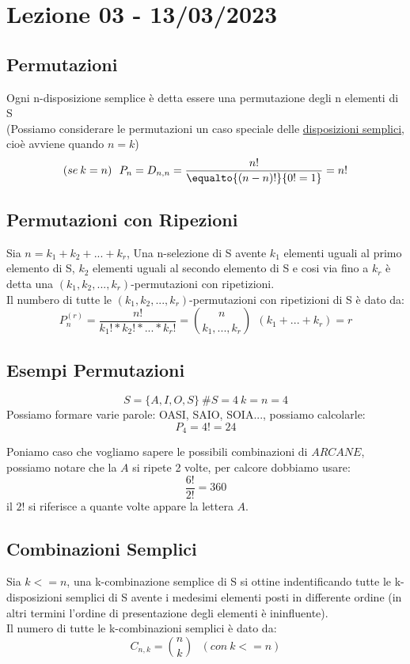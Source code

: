 \section{Lezione 03 - 13/03/2023}

\subsection{Permutazioni}
Ogni n-disposizione semplice è detta essere una permutazione degli n elementi di S\\
(Possiamo considerare le permutazioni un caso speciale delle 
\hyperref[sec:disposizioni]{disposizioni semplici}, cioè avviene quando $n=k$)
$$ (se \: k=n) \: \: \: P_n = D_{n,n} = \frac{n!}{\equalto{(n-n)!}{0!=1}} = n!  $$

\subsection{Permutazioni con Ripezioni}
Sia $n=k_1+k_2+...+k_r$, Una n-selezione di S avente $k_1$ elementi uguali al primo elemento di S, $k_2$ elementi uguali al secondo elemento di S e cosi via fino a $k_r$ è detta una $(k_1,k_2,...,k_r)$-permutazioni con ripetizioni.\\
Il numbero di tutte le $(k_1,k_2,...,k_r)$-permutazioni con ripetizioni di S è dato da:
$$ P^{(r)}_n = \frac{n!}{k_1! * k_2! * ... * k_r!} = \binom{n}{k_1,...,k_r} \: \: (k_1+...+k_r)=r$$

\subsection{Esempi Permutazioni}
$$ S=\{A,I,O,S\} \: \#S=4 \: k=n=4  $$
Possiamo formare varie parole: OASI, SAIO, SOIA..., possiamo calcolarle:
$$ P_4 = 4! = 24  $$

Poniamo caso che vogliamo sapere le possibili combinazioni di $ARCANE$, possiamo notare che la $A$ si ripete 2 volte, per calcore dobbiamo usare:
$$ \frac{6!}{2!} = 360 $$
il $2!$ si riferisce a quante volte appare la lettera $A$.

\subsection{Combinazioni Semplici}
Sia $k<=n$, una k-combinazione semplice di S si ottine indentificando tutte le k-disposizioni semplici di S avente i medesimi elementi posti in differente ordine (in altri termini l'ordine di presentazione degli elementi è ininfluente).\\
Il numero di tutte le k-combinazioni semplici è dato da:
$$ C_{n,k} = \binom{n}{k} \: \: \: (con\:k<=n)$$

